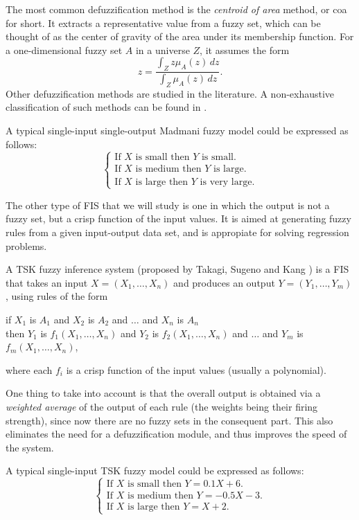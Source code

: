 The most common defuzzification method is the \textit{centroid of area} method, or \acrshort{coa} for short. It extracts a representative value from a fuzzy set, which can be thought of as the center of gravity of the area under its membership function. For a one-dimensional fuzzy set $A$ in a universe $Z$, it assumes the form
\[
z = \frac{\int_Z z\mu_A(z)\, dz}{\int_Z \mu_A(z)\, dz}.
\]
Other defuzzification methods are studied in the literature. A non-exhaustive classification of such methods can be found in \cite{leekwijck1999defuzzification}.

\begin{example}
  A typical single-input single-output Madmani fuzzy model could be expressed as follows:
  \[
  \left\{ \begin{array}{l}
	\text{If $X$ is small then $Y$ is small}.\\
  \text{If $X$ is medium then $Y$ is large}.\\
	\text{If $X$ is large then $Y$ is very large}.
\end{array}\right.
\]
\end{example}

The other type of FIS that we will study is one in which the output is not a fuzzy set, but a crisp function of the input values. It is aimed at generating fuzzy rules from a given input-output data set, and is appropiate for solving regression problems.

\begin{definition} A TSK fuzzy inference system (proposed by Takagi, Sugeno and Kang \cite{takagi1985identification, sugeno1988structure}) is a FIS that takes an input $X=(X_1,\dots,X_n)$ and produces an output $Y = (Y_1, \dots, Y_m)$, using rules of the form
\begin{center}
  if $X_1$ is $A_1$ and $X_2$ is $A_2$ and $\dots$ and $X_n$ is $A_n$\\
  then $Y_1$ is $f_1(X_1, \dots, X_n)$ and $Y_2$ is $f_2(X_1, \dots, X_n)$ and $\dots$ and $Y_m$ is $f_m(X_1, \dots, X_n)$,
\end{center}
where each $f_i$ is a crisp function of the input values (usually a polynomial).
\end{definition}

One thing to take into account is that the overall output is obtained via a \textit{weighted average} of the output of each rule (the weights being their firing strength), since now there are no fuzzy sets in the consequent part. This also eliminates the need for a defuzzification module, and thus improves the speed of the system.

\begin{example}
  A typical single-input TSK fuzzy model could be expressed as follows:
  \[
  \left\{ \begin{array}{l}
	\text{If $X$ is small then $Y=0.1X + 6$}.\\
  \text{If $X$ is medium then $Y=-0.5X -3$}.\\
	\text{If $X$ is large then $Y=X+2$}.
\end{array}\right.
\]
\end{example}
